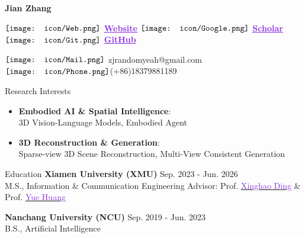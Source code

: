 \documentclass{resume} %
\newcommand*\git{\vcenter{\hbox{\texttt{[image: icon/Git.png]}}}}
\newcommand*\Google{\vcenter{\hbox{\texttt{[image: icon/Google.png]}}}}
\newcommand*\web{\vcenter{\hbox{\texttt{[image: icon/Web.png]}}}}
\newcommand*\email{\vcenter{\hbox{\texttt{[image: icon/Mail.png]}}}}
\newcommand*\phone{\vcenter{\hbox{\texttt{[image: icon/Phone.png]}}}}
\begin{document}
\begin{vwcol}[widths={0.4,0.6}, sep=.8cm, justify=flush,rule=0pt,indent=1em] 
\huge{\textbf{Jian Zhang}}

\small $\web$ \href{https://jian-zhang-3dv.github.io/Jian-Zhang-3DV/}{\textcolor{BlueViolet}{\underline{\textbf{Website}}}} 
\hspace{0mm} $\Google$ \href{https://scholar.google.com/citations?user=qBNtBsAAAAAJ&hl=en&oi=sra}{\textcolor{BlueViolet}{\bf \underline{Scholar}}} \hspace{0mm} $\git$ \href{https://github.com/Jian-Zhang-3DV}{\textcolor{BlueViolet}{\bf \underline{GitHub}}}

$\email$ zjrandomyeah@gmail.com \hspace{0mm} $\phone$(+86)18379881189
\end{vwcol} 

\vspace{-0.7mm}
\begin{rSection}{Research Interests}
\vspace{-1mm}
\begin{itemize}[leftmargin=1.5em, itemsep=-0.5mm]
    \item \textbf{Embodied AI \& Spatial Intelligence}: 
    \\ \small 3D Vision-Language Models, Embodied Agent
    \item \textbf{3D Reconstruction \& Generation}: 
    \\ \small Sparse-view 3D Scene Reconstruction, Multi-View Consistent Generation
\end{itemize}
\end{rSection}

\vspace{-1.5mm}

\begin{rSection}{Education}
\vspace{-0mm}
\vspace{-1mm}
{\bf Xiamen University (XMU)} \hfill Sep. 2023 - Jun. 2026
\\ M.S., Information \& Communication Engineering 
\hfill Advisor: Prof. \href{https://scholar.google.com.hk/citations?user=k5hVBfMAAAAJ&hl=zh-CN}{\textcolor{BlueViolet}{Xinghao Ding}} \& Prof. \href{https://huangyue05.github.io/}{\textcolor{BlueViolet}{Yue Huang}}

\vspace{-1mm}
{\bf Nanchang University (NCU)} \hfill Sep. 2019 - Jun. 2023
\\ B.S., Artificial Intelligence

\end{rSection}
\end{document}
